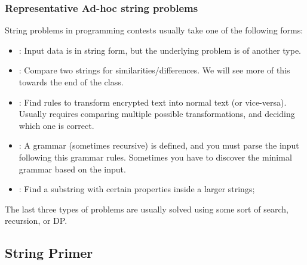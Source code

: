 \documentclass{beamer}
\begin{document}
\begin{frame}
  \frametitle{Representative Ad-hoc string problems}
  {\smaller

  String problems in programming contests usually take one of the
  following forms:

  \begin{exampleblock}{}
    \begin{itemize}
    \item {}: Input data is in string form, but
      the underlying problem is of another type.
    \item {}: Compare two strings for
      similarities/differences. We will see more of this towards the end
      of the class.
    \item {}: Find rules to transform encrypted
      text into normal text (or vice-versa). Usually requires comparing
      multiple possible transformations, and deciding which one is
      correct.
    \item {}: A grammar (sometimes recursive) is defined, 
      and you must parse the input following this grammar rules. Sometimes
      you have to discover the minimal grammar based on the input.
    \item {}: Find a substring with certain
      properties inside a larger strings;
    \end{itemize}
  \end{exampleblock}

  \bigskip

  The last three types of problems are usually solved using some sort
  of search, recursion, or DP.
  }
\end{frame}

\subsection{String Primer}
\end{document}
